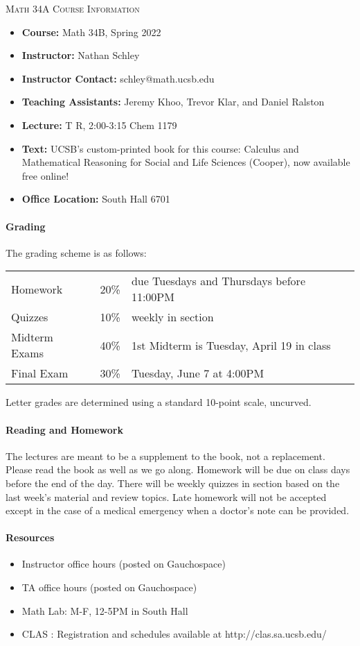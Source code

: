 \documentclass[a4paper,12pt]{article}
\begin{document}
\begin{center} {\Large \scshape Math 34A Course Information}
\end{center}

\vspace{0.75cm}

\begin{itemize}
\item {\bf Course:} Math 34B, Spring 2022
\item {\bf Instructor:} Nathan Schley
\item {\bf Instructor Contact:} schley@math.ucsb.edu
\item {\bf Teaching Assistants:} Jeremy Khoo, Trevor Klar, and Daniel Ralston
\item {\bf Lecture:} T R, 2:00-3:15 Chem 1179
\item {\bf Text:} UCSB's custom-printed book for this course: Calculus and Mathematical Reasoning for Social and Life Sciences (Cooper), now available free online!
\item {\bf Office Location:} South Hall 6701
\end{itemize}

\paragraph{Grading}
The grading scheme is as follows:
\begin{center}
\begin{tabular}{lll}
Homework       & 20\% & due Tuesdays and Thursdays before 11:00PM \\
Quizzes        & 10\% & weekly in section  \\ 
Midterm Exams & 40\% & 1st Midterm is Tuesday, April 19 in class \\
Final Exam  & 30\% & Tuesday, June 7 at 4:00PM
\end{tabular}
\end{center}
Letter grades are determined using a standard 10-point scale, uncurved.



\paragraph{Reading and Homework}
 The lectures are meant to be a supplement to the book, not a replacement. Please read the book as well as we go along. Homework will be due on class days before the end of the day. There will be weekly quizzes in section based on the last week's material and review topics. Late homework will not be accepted except in the case of a medical emergency when a doctor's note can be provided. 




\paragraph{Resources}
\begin{itemize}
\item Instructor office hours (posted on Gauchospace)
\item TA office hours (posted on Gauchospace)
\item Math Lab: M-F, 12-5PM in South Hall
\item CLAS : Registration and schedules available at http://clas.sa.ucsb.edu/
\end{itemize} 
\end{document}
